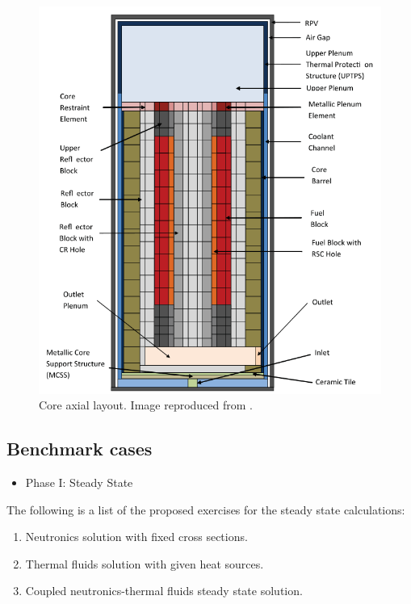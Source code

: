 \documentclass{anstrans}
\begin{document}
\begin{figure}[htbp!]
	\centering
	\includegraphics[width=0.95\linewidth]{figures/axial-layout.png}
	\hfill
	\caption{Core axial layout. Image reproduced from \cite{oecd_nea_benchmark_2017}.}
	\label{fig:axial}
\end{figure}

\subsection{Benchmark cases}

\begin{itemize}
	\item Phase I: Steady State
\end{itemize}

The following is a list of the proposed exercises for the steady state calculations:

\begin{enumerate}
	\item Neutronics solution with fixed cross sections. 
	\item Thermal fluids solution with given heat sources.
	\item Coupled neutronics-thermal fluids steady state solution.
\end{enumerate}
\end{document}
